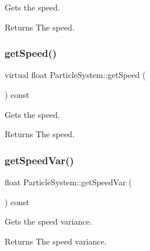 Gets the speed.

\begin{DoxyReturn}{Returns}
The speed. 
\end{DoxyReturn}
\mbox{\label{classParticleSystem_aa7bf969cc80cb87a09a306ffa948f365}} 
\subsubsection{\texorpdfstring{get\+Speed()}{getSpeed()}\hspace{0.1cm}{\footnotesize\ttfamily [2/2]}}
{\footnotesize\ttfamily virtual float Particle\+System\+::get\+Speed (\begin{DoxyParamCaption}{ }\end{DoxyParamCaption}) const\hspace{0.3cm}{\ttfamily [virtual]}}

Gets the speed.

\begin{DoxyReturn}{Returns}
The speed. 
\end{DoxyReturn}
\mbox{\label{classParticleSystem_a1cc750129c3dbec9c5b4c7d441a32fec}} 
\subsubsection{\texorpdfstring{get\+Speed\+Var()}{getSpeedVar()}\hspace{0.1cm}{\footnotesize\ttfamily [1/2]}}
{\footnotesize\ttfamily float Particle\+System\+::get\+Speed\+Var (\begin{DoxyParamCaption}{ }\end{DoxyParamCaption}) const\hspace{0.3cm}{\ttfamily [virtual]}}

Gets the speed variance.

\begin{DoxyReturn}{Returns}
The speed variance. 
\end{DoxyReturn}
\mbox{\label{classParticleSystem_a64eea072c0c4cc4ac912d6f9cf95f835}} 
